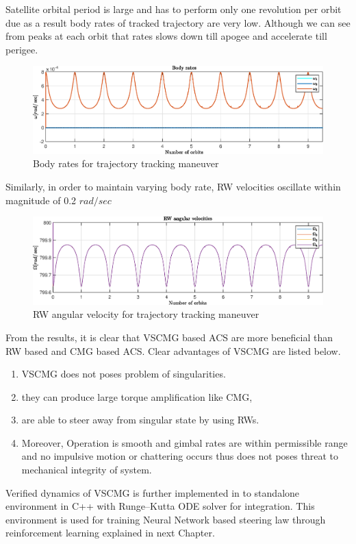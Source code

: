 Satellite orbital period is large and has to perform only one revolution per orbit due as a result body rates of tracked trajectory are very low. Although we can see from peaks at each orbit that rates slows down till apogee and accelerate till perigee.
\begin{figure}[H]
     \centering
    \includegraphics[width=0.9\columnwidth]{figures/plots/VSCMG/vs_ref_mol_w.eps}
    \caption{Body rates for trajectory tracking maneuver}
    \label{plt:vs_ref_mol_w}
\end{figure}
\noindent Similarly, in order to maintain varying body rate, RW velocities oscillate within magnitude of 0.2 $rad/sec$
\begin{figure}[H]
     \centering
    \includegraphics[width=0.9\columnwidth]{figures/plots/VSCMG/vs_ref_mol_Om.eps}
    \caption{RW angular velocity for trajectory tracking maneuver}
    \label{plt:vs_ref_mol_Om}
\end{figure}

From the results, it is clear that VSCMG based ACS are more beneficial than RW based and CMG based ACS. Clear advantages of VSCMG are listed below.

\begin{enumerate}
    \item VSCMG does not poses problem of singularities.
    \item they can produce large torque amplification like CMG,
    \item are able to steer away from singular state by using RWs.
    \item Moreover, Operation is smooth and gimbal rates are within permissible range and no impulsive motion or chattering occurs thus does not poses threat to mechanical integrity of system.
\end{enumerate}

Verified dynamics of VSCMG is further implemented in to standalone environment in C++ with Runge–Kutta ODE solver for integration. This environment is used for training Neural Network based steering law through reinforcement learning explained in next Chapter.
